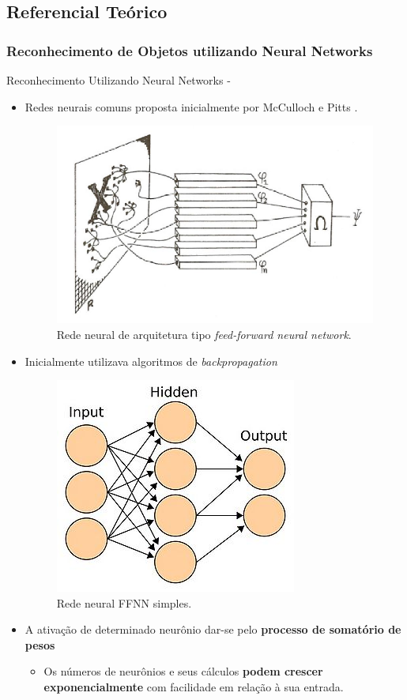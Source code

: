 \documentclass[aspectratio=169, xcolor=dvipsnames]{beamer}
\let\olditem=\item%
\renewcommand{\item}{\olditem \justifying}
\begin{document}
	\subsection{Referencial Teórico}
		\subsubsection{Reconhecimento de Objetos utilizando Neural Networks}
		\begin{frame}[allowframebreaks]{Reconhecimento Utilizando Neural Networks -}
			\begin{itemize}
				\item Redes neurais comuns proposta inicialmente por McCulloch e Pitts \cite{McCulloch1943} \cite{Bengio-2009}.

				\begin{figure}[h]
					\centering
					\includegraphics[width=0.5\linewidth]{img/single_layer_cnn.png}
					\caption{Rede neural de arquitetura tipo \textit{feed-forward neural network}.}
					\label{fig:single_layer_cnn.png}
				\end{figure}

				\item Inicialmente utilizava algoritmos de \textit{backpropagation}

				\begin{figure}[h]
					\centering
					\includegraphics[width=0.4\linewidth]{img/ffnn.jpg}
					\caption{Rede neural FFNN simples.}
					\label{fig:ffnn.jpg}
				\end{figure}

				\setlength\itemsep{2em}
				\item A ativação de determinado neurônio dar-se pelo \textbf{processo de somatório de pesos}
				\begin{itemize}
					\item Os números de neurônios e seus cálculos \textbf{podem crescer exponencialmente} com facilidade em relação à sua entrada.


\end{itemize}
\end{itemize}
\end{frame}
\end{document}
